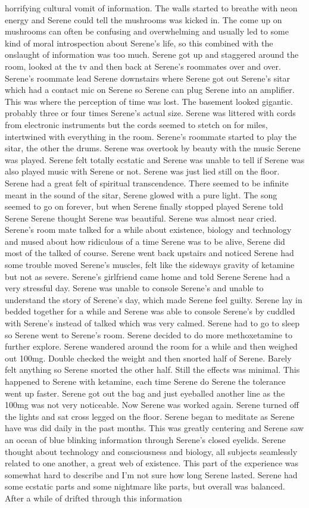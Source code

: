 \documentclass[12pt]{book}
\begin{document}
horrifying cultural vomit of information. The walls started to breathe with neon energy and Serene could tell the mushrooms was kicked in. The come up on mushrooms can often be confusing and overwhelming and usually led to some kind of moral introspection about Serene's life, so this combined with the onslaught of information was too much. Serene got up and staggered around the room, looked at the tv and then back at Serene's roommates over and over. Serene's roommate lead Serene downstairs where Serene got out Serene's sitar which had a contact mic on Serene so Serene can plug Serene into an amplifier. This was where the perception of time was lost. The basement looked gigantic. probably three or four times Serene's actual size. Serene was littered with cords from electronic instruments but the cords seemed to stetch on for miles, intertwined with everything in the room. Serene's roommate started to play the sitar, the other the drums. Serene was overtook by beauty with the music Serene was played. Serene felt totally ecstatic and Serene was unable to tell if Serene was also played music with Serene or not. Serene was just lied still on the floor. Serene had a great felt of spiritual transcendence. There seemed to be infinite meant in the sound of the sitar, Serene glowed with a pure light. The song seemed to go on forever, but when Serene finally stopped played Serene told Serene Serene thought Serene was beautiful. Serene was almost near cried. Serene's room mate talked for a while about existence, biology and technology and mused about how ridiculous of a time Serene was to be alive, Serene did most of the talked of course. Serene went back upstairs and noticed Serene had some trouble moved Serene's muscles, felt like the sideways gravity of ketamine but not as severe. Serene's girlfriend came home and told Serene Serene had a very stressful day. Serene was unable to console Serene's and unable to understand the story of Serene's day, which made Serene feel guilty. Serene lay in bedded together for a while and Serene was able to console Serene's by cuddled with Serene's instead of talked which was very calmed. Serene had to go to sleep so Serene went to Serene's room. Serene decided to do more methoxetamine to further explore. Serene wandered around the room for a while and then weighed out 100mg. Double checked the weight and then snorted half of Serene. Barely felt anything so Serene snorted the other half. Still the effects was minimal. This happened to Serene with ketamine, each time Serene do Serene the tolerance went up faster. Serene got out the bag and just eyeballed another line as the 100mg was not very noticeable. Now Serene was worked again. Serene turned off the lights and sat cross legged on the floor. Serene began to meditate as Serene have was did daily in the past months. This was greatly centering and Serene saw an ocean of blue blinking information through Serene's closed eyelids. Serene thought about technology and consciousness and biology, all subjects seamlessly related to one another, a great web of existence. This part of the experience was somewhat hard to describe and I'm not sure how long Serene lasted. Serene had some ecstatic parts and some nightmare like parts, but overall was balanced. After a while of drifted through this information 
\end{document}
